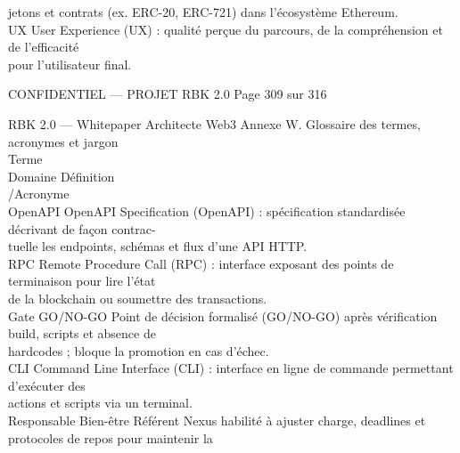 \documentclass[12pt,landscape,a4paper]{article}
\newenvironment{confidential}
{\begin{tcolorbox}[
    colback=rbkred!5!white,
    colframe=rbkred!75!black,
    title=CONFIDENTIEL,
    fonttitle=\bfseries\color{white},
    coltitle=rbkred!75!black,
    breakable,
    enhanced,
    frame hidden,
    borderline west={2pt}{0pt}{rbkred!75!black}
]}
{\end{tcolorbox}}
\begin{document}
jetons et contrats (ex. ERC-20, ERC-721) dans l’écosystème Ethereum.\\
\vspace{0.5em}
UX                                      User Experience (UX) : qualité perçue du parcours, de la compréhension et de l’efficacité\\
pour l’utilisateur final.\\
\vspace{0.5em}
\vspace{0.5em}
\vspace{0.5em}
\vspace{0.5em}
\begin{confidential}CONFIDENTIEL — PROJET RBK 2.0                    Page 309 sur 316\end{confidential}
RBK 2.0 — Whitepaper Architecte Web3                                              Annexe W. Glossaire des termes, acronymes et jargon\\
\vspace{0.5em}
\vspace{0.5em}
Terme\\
Domaine    Définition\\
/Acronyme\\
OpenAPI                                 OpenAPI Specification (OpenAPI) : spécification standardisée décrivant de façon contrac-\\
tuelle les endpoints, schémas et flux d’une API HTTP.\\
\vspace{0.5em}
RPC                                     Remote Procedure Call (RPC) : interface exposant des points de terminaison pour lire l’état\\
de la blockchain ou soumettre des transactions.\\
\vspace{0.5em}
Gate GO/NO-GO                           Point de décision formalisé (GO/NO-GO) après vérification build, scripts et absence de\\
hardcodes ; bloque la promotion en cas d’échec.\\
\vspace{0.5em}
CLI                                     Command Line Interface (CLI) : interface en ligne de commande permettant d’exécuter des\\
actions et scripts via un terminal.\\
\vspace{0.5em}
Responsable Bien-être                   Référent Nexus habilité à ajuster charge, deadlines et protocoles de repos pour maintenir la\\
\end{document}
